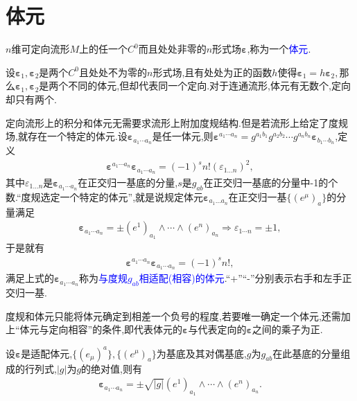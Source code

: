 \section{体元}

$n$维可定向流形$M$上的任一个$C^0$而且处处非零的$n$形式场$\boldsymbol{\varepsilon}$,称为一个\textcolor{blue}{体元}.

\begin{remark}
    设$\boldsymbol{\varepsilon}_1,\boldsymbol{\varepsilon}_2$是两个$C^0$且处处不为零的$n$形式场,且有处处为正的函数$h$使得$\boldsymbol{\varepsilon}_1=h\boldsymbol{\varepsilon}_2,$那么$\boldsymbol{\varepsilon}_1,\boldsymbol{\varepsilon}_2$是两个不同的体元,但却代表同一个定向.对于连通流形,体元有无数个,定向却只有两个.
\end{remark}
定向流形上的积分和体元无需要求流形上附加度规结构.但是若流形上给定了度规场,就存在一个特定的体元.设$\boldsymbol{\varepsilon}_{a_1\cdots a_n}$是任一体元,则$\boldsymbol{\varepsilon}^{a_1\cdots a_n}=g^{a_1b_1}g^{a_2b_2} \cdots g^{a_nb_n}\boldsymbol{\varepsilon}_{b_1\cdots b_n}$,定义
\begin{align}
\boldsymbol{\varepsilon}^{a_1\cdots a_n}\boldsymbol{\varepsilon}_{a_1\cdots a_n}=(-1)^sn!(\varepsilon_{1\dots n})^2,
\end{align}
其中${\varepsilon}_{1\dots n}$是$\boldsymbol{\varepsilon}_{a_1\cdots a_n}$在正交归一基底的分量,$s$是$g_{ab}$在正交归一基底的分量中-1的个数.“度规选定一个特定的体元”,就是说规定体元$\boldsymbol{\varepsilon}_{a_1\dots a_n}$在正交归一基$\{(e^\mu)_a\}$的分量满足
\begin{align}
\boldsymbol{\varepsilon}_{a_1\cdots a_n}=\pm (e^1)_{a_1}\wedge\cdots \wedge (e^n)_{a_n}\Rightarrow \varepsilon_{1\cdots n}=\pm 1,
\end{align}
于是就有
\begin{align}
\boldsymbol{\varepsilon}^{a_1\cdots a_n}\boldsymbol{\varepsilon}_{a_1\cdots a_n}=(-1)^sn!,
\end{align}
满足上式的$\boldsymbol{\varepsilon}_{a_1\cdots a_n}$称为\textcolor{blue}{与度规$g_{ab}$相适配(相容)的体元}.“+”“-”分别表示右手和左手正交归一基.
\begin{remark}
    度规和体元只能将体元确定到相差一个负号的程度,若要唯一确定一个体元,还需加上“体元与定向相容”的条件,即代表体元的$\boldsymbol{\varepsilon}$与代表定向的$\boldsymbol{\varepsilon}$之间的乘子为正.
\end{remark}

设$\boldsymbol{\varepsilon}$是适配体元,$\{(e_\mu)^a\},\{(e^\mu)_a\}$为基底及其对偶基底,$g$为$g_{ab}$在此基底的分量组成的行列式,$|g|$为$g$的绝对值,则有
\begin{align}
\boldsymbol{\varepsilon}_{a_1\cdots a_n}=\pm\sqrt{|g|} (e^1)_{a_1}\wedge\cdots \wedge (e^n)_{a_n}.
\end{align}


